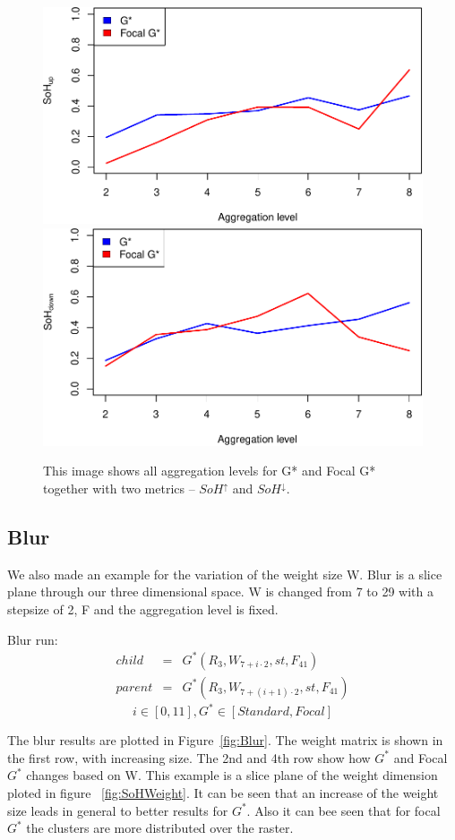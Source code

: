 \documentclass{itatnew}
\begin{document}
\begin{figure}[htp]
  \vspace{2em}
  \includegraphics[width=.45\linewidth]{images/gen-zoom-sohup-1}
  \hspace{1em}
  \includegraphics[width=.45\linewidth]{images/gen-zoom-sohdown-1}
  
  \caption{
    This image shows all aggregation levels for G* and Focal G* together 
    with two metrics -- $SoH^\uparrow$ and $SoH^\downarrow$.
  }
  \label{fig:Zoom}
\end{figure}

\subsection{Blur}
We also made an example for the variation of the weight size W.
Blur is a slice plane through our three dimensional space. 
W is changed from 7 to 29 with a stepsize of 2, F and the aggregation level is fixed.
\begin{definition} Blur run:
\begin{eqnarray*}
    child & = & G^*(R_3, W_{7+i \cdot 2}, st, F_{41}) \\
    parent & = & G^*(R_3, W_{7+(i+1)\cdot 2}, st, F_{41})
  \end{eqnarray*}
\begin{displaymath}
i \in [0,11], G^* \in [Standard, Focal]
\end{displaymath}
\end{definition}
The blur results are plotted in Figure~\ref{fig:Blur}. The weight matrix is
shown in the first row, with increasing size. The 2nd and 4th row show how
$G^*$ and Focal $G^*$ changes based on W. This example is a slice plane of the
weight dimension ploted in figure ~\ref{fig:SoHWeight}. It can be seen that an
increase of the weight size leads in general to better results for $G^*$.
Also it can bee seen that for focal $G^*$ the clusters are more distributed over the raster.
\end{document}
